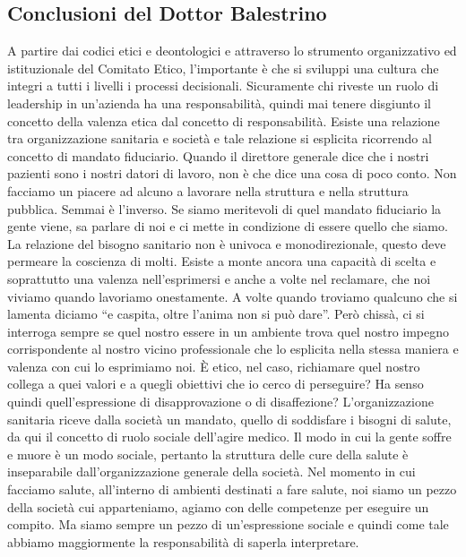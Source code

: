\subsection{Conclusioni del Dottor Balestrino}

A partire dai codici etici e deontologici e attraverso lo strumento
organizzativo ed istituzionale del Comitato Etico, l'importante è che si
sviluppi una cultura che integri a tutti i livelli i processi
decisionali. Sicuramente chi riveste un ruolo di leadership in
un'azienda ha una responsabilità, quindi mai tenere disgiunto il
concetto della valenza etica dal concetto di responsabilità. Esiste una
relazione tra organizzazione sanitaria e società e tale relazione si
esplicita ricorrendo al concetto di mandato fiduciario. Quando il
direttore generale dice che i nostri pazienti sono i nostri datori di
lavoro, non è che dice una cosa di poco conto. Non facciamo un piacere
ad alcuno a lavorare nella struttura e nella struttura pubblica. Semmai
è l'inverso. Se siamo meritevoli di quel mandato fiduciario la gente
viene, sa parlare di noi e ci mette in condizione di essere quello che
siamo. La relazione del bisogno sanitario non è univoca e
monodirezionale, questo deve permeare la coscienza di molti. Esiste a
monte ancora una capacità di scelta e soprattutto una valenza
nell'esprimersi e anche a volte nel reclamare, che noi viviamo quando
lavoriamo onestamente. A volte quando troviamo qualcuno che si lamenta
diciamo ``e caspita, oltre l'anima non si può dare''. Però chissà, ci si
interroga sempre se quel nostro essere in un ambiente trova quel nostro
impegno corrispondente al nostro vicino professionale che lo esplicita
nella stessa maniera e valenza con cui lo esprimiamo noi. È etico, nel
caso, richiamare quel nostro collega a quei valori e a quegli obiettivi
che io cerco di perseguire? Ha senso quindi quell'espressione di
disapprovazione o di disaffezione? L'organizzazione sanitaria riceve
dalla società un mandato, quello di soddisfare i bisogni di salute, da
qui il concetto di ruolo sociale dell'agire medico. Il modo in cui la
gente soffre e muore è un modo sociale, pertanto la struttura delle cure
della salute è inseparabile dall'organizzazione generale della società.
Nel momento in cui facciamo salute, all'interno di ambienti destinati a
fare salute, noi siamo un pezzo della società cui apparteniamo, agiamo
con delle competenze per eseguire un compito. Ma siamo sempre un pezzo
di un'espressione sociale e quindi come tale abbiamo maggiormente la
responsabilità di saperla interpretare.

